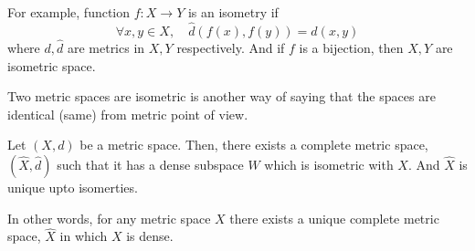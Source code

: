 For example, function $f : X \to Y$ is an isometry if
\[ \forall x,y \in X,\quad \hat{d}(f(x),f(y)) = d(x,y) \]
where $d, \hat{d}$ are metrics in $X,Y$ respectively.
And if  $f$ is a bijection, then $X,Y$ are isometric space.\\

\begin{commentary}
	Two metric spaces are isometric is another way of saying that the spaces are identical (same) from metric point of view.
\end{commentary}

\begin{theorem}[completion]
	Let $(X,d)$ be a metric space.
	Then, there exists a complete metric space, $(\hat{X},\hat{d})$ such that it has a dense subspace $W$ which is isometric with $X$.
	And $\hat{X}$ is unique upto isomerties.
\end{theorem}
\begin{commentary}
	In other words, for any metric space $X$ there exists a unique complete metric space, $\hat{X}$ in which $X$ is dense.
\end{commentary}

